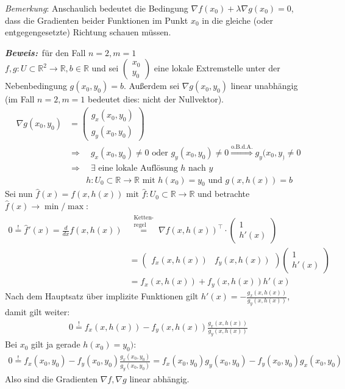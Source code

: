 \documentclass[11pt,a4paper]{book}
\newcommand {\R}	{\mathbb{R}}
\newcommand {\Rzwei}	{\mathbb{R}^2}
\newcommand{\1}    	{\mathbbm{1}}
\newcommand{\mitt}	{\textrm{ mit }}
\newcommand{\Beweis}[1][Beweis]
{\begin{mdframed}[backgroundcolor=gray!10,linewidth=0pt]\noindent\textit{\textbf{{#1}:}}~}
\newcommand{\QED}	{\end{mdframed}}
\newcommand{\Bemerkung}	{\noindent\textit{Bemerkung}: }
\begin{document}
\Bemerkung Anschaulich bedeutet die Bedingung \(\nabla f(x_0) + \lambda \nabla g(x_0) = 0\), dass die Gradienten beider Funktionen im Punkt \(x_0\) in die gleiche (oder entgegengesetzte) Richtung schauen müssen.

\Beweis für den Fall \(n=2, m=1\) \\
\(f,g : U \subset \Rzwei \rightarrow \R, b \in \R\) und sei \(\left(\begin{array}{c}
	x_0 \\ y_0
\end{array} \right) \) eine lokale Extremstelle unter der Nebenbedingung \(g(x_0,y_0) = b\). Außerdem sei \(\nabla g(x_0,y_0) \) linear unabhängig (im Fall \(n=2, m=1\) bedeutet dies: nicht der Nullvektor).
\begin{align*}
	\nabla g(x_0,y_0) &= \left( \begin{array}{c}
		g_x(x_0,y_0) \\
		g_y(x_0,y_0)
	\end{array} \right) \\
	&\Rightarrow \quad
	g_x(x_0,y_0) \neq 0 \textrm{ oder } g_y(x_0,y_0) \neq 0
	\stackrel{\textrm{o.B.d.A.}}{\Rightarrow} g_y(x_0,y_) \neq 0 \\
	&\Rightarrow\quad
	\exists \textrm{ eine lokale Auflösung }h\textrm{ nach }y \\
	&\quad\quad h:U_0 \subset \R \rightarrow \R \mitt h(x_0) = y_0 \textrm{ und } g(x,h(x)) = b 
\end{align*}
Sei nun \(\hat{f}(x) = f(x,h(x)) \mitt \hat{f} : U_0 \subset \R \rightarrow \R\) und betrachte \(\hat{f}(x) \rightarrow \min/\max\):
\begin{align*}
	0 \stackrel{!}{=} \hat{f}'(x) = \frac{d}{dx} f(x,h(x)) 
	&\stackrel{\substack{\textrm{Ketten-}\\\textrm{regel}}}{=} \nabla f(x,h(x))^\top \cdot \left( \begin{array}{c} 1 \\ h'(x) \end{array} \right) \\
	&= 
	\left( \begin{array}{cc}
		f_x(x,h(x)) &
		f_y(x,h(x)) 
	\end{array} \right) \left( \begin{array}{c}
		1 \\ h'(x)
	\end{array} \right) \\
	&= f_x(x,h(x)) + f_y(x,h(x)) h'(x)
\end{align*}
Nach dem Hauptsatz über implizite Funktionen gilt \(h'(x) = -\frac{g_x(x,h(x))}{g_y(x,h(x))}\), damit gilt weiter:
\begin{align*}
	0 \stackrel{!}{=} f_x(x,h(x)) - f_y(x,h(x)) \frac{g_x(x,h(x))}{g_y(x,h(x))}
\end{align*}
Bei \(x_0\) gilt ja gerade \(h(x_0) = y_0)\):
\begin{align*}
	0 \stackrel{!}{=} f_x(x_0,y_0) - f_y(x_0,y_0) \frac{g_x(x_0,y_0)}{g_y(x_0,y_0)} = f_x(x_0,y_0) g_y(x_0,y_0) - f_y(x_0,y_0) g_x(x_0,y_0) 
\end{align*}
Also sind die Gradienten \(\nabla f, \nabla g\) linear abhängig.
\QED
\end{document}

